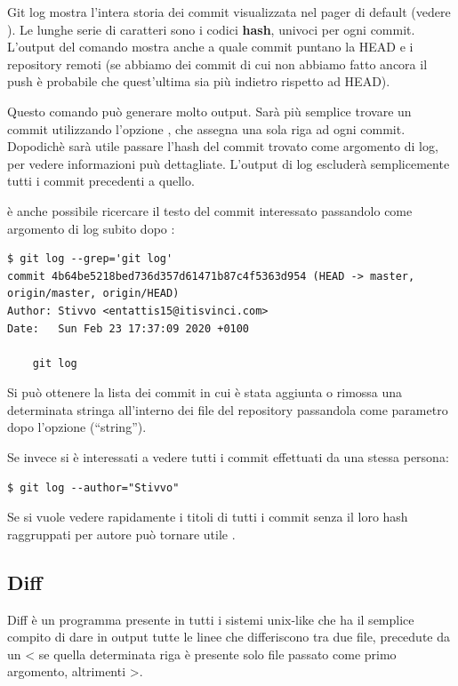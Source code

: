 \documentclass{article}
\begin{document}
Git log mostra l'intera storia dei commit visualizzata nel pager di default
(vedere ).
Le lunghe serie di caratteri sono i codici \textbf{hash}, univoci per ogni
commit. L'output del comando mostra anche a quale commit puntano la HEAD e i
repository remoti (se abbiamo dei commit di cui non abbiamo fatto ancora il push
è probabile che quest'ultima sia più indietro rispetto ad HEAD).

Questo comando può generare molto output. Sarà più semplice trovare un commit
utilizzando l'opzione , che assegna una sola
riga ad ogni commit. Dopodichè sarà utile passare l'hash del commit trovato come
argomento di log, per vedere informazioni puù dettagliate. L'output di log
escluderà semplicemente tutti i commit precedenti a quello.

è anche possibile ricercare il testo del commit interessato passandolo come
argomento di log subito dopo :

\begin{verbatim}
$ git log --grep='git log'
commit 4b64be5218bed736d357d61471b87c4f5363d954 (HEAD -> master, origin/master, origin/HEAD)
Author: Stivvo <entattis15@itisvinci.com>
Date:   Sun Feb 23 17:37:09 2020 +0100

    git log
\end{verbatim}

Si può ottenere la lista dei commit in cui è stata aggiunta o rimossa una
determinata stringa all'interno dei file del repository passandola come
parametro dopo l'opzione  (``string'').

Se invece si è interessati a vedere tutti i commit effettuati da una stessa
persona:

\begin{verbatim}
$ git log --author="Stivvo"
\end{verbatim}

Se si vuole vedere rapidamente i titoli di tutti i commit senza il loro hash 
raggruppati per autore può tornare utile .

\subsection{Diff}
Diff è un programma presente in tutti i sistemi unix-like che ha il semplice
compito di dare in output tutte le linee che differiscono tra due file,
precedute da un < se quella determinata riga è presente solo file passato come
primo argomento, altrimenti >.
\end{document}
